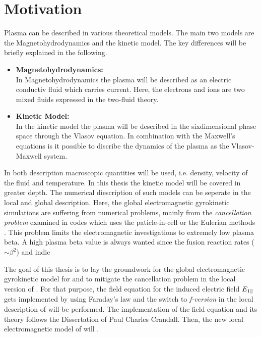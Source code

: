 
\NewPage
\chapter{Motivation}
\label{chap:motivation}

\thispagestyle{empty}
\newpage


Plasma can be described in various theoretical models. The main two models are the Magnetohydrodynamics and the kinetic model. The key differences will be briefly explained in the following.
\begin{itemize}
    \item \textbf{Magnetohydrodynamics:}\\
        In Magnetohydrodynamics the plasma will be described as an electric conductiv fluid which carries current. Here, the electrons and ions are two mixed fluids expressed in the two-fluid theory. 
    \item \textbf{Kinetic Model:}\\
        In the kinetic model the plasma will be described in the sixdimensional phase space through the Vlasov equation. In combination with the Maxwell's equations is it possible to discribe the dynamics of the plasma as the Vlasov-Maxwell system. 
\end{itemize}
In both description macroscopic quantities will be used, i.e. density, velocity of the fluid and temperature. In this thesis the kinetic model will be covered in greater depth. The numerical diescription of such models can be seperate in the local and global description. Here, the global electromagnetic gyrokinetic simulations are suffering from numerical problems, mainly from the \textit{cancellation problem} \cite{Chen2001} examined in codes which uses the paticle-in-cell or the Eulerian methods \cite{Cummings_PHD}. This problem limits the electromagnetic investigations to extremely low plasma beta. \cite{Naitou1995} A high plasma beta value is always wanted since the fusion reaction rates ($\sim \beta^2$) and indic

The goal of this thesis is to lay the groundwork for the global electromagnetic gyrokinetic model for \gkw and to mitigate the cancellation problem in the local version of \gkw. For that purpose, the field equation for the induced electric field $E_{1\parallel}$ gets implemented by using Faraday's law and the switch to \textit{f-version} in the local description of \gkw will be performed. The implementation of the field equation and its theory follows the Dissertation of Paul Charles Crandall\cite{Crandall_PHD}. Then, the new local electromagnetic model of \gkw will .